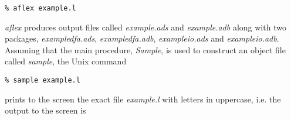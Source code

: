 \small
\begin{verbatim}
% aflex example.l
\end{verbatim}
\normalsize
   
{\sl aflex} produces output files called {\it example.ads} and {\it example.adb}
along with two packages, {\it example\-dfa.ads}, {\it example\-dfa.adb}, 
{\it example\-io.ads} and {\it example\-io.adb}.
Assuming that the main procedure, {\sl Sample}, is used to construct
an object file called {\it sample}, the Unix command

\small
\begin{verbatim}
% sample example.l
\end{verbatim}
\normalsize

prints to the screen the exact file {\it example.l} with letters in 
uppercase, i.e. the output to the screen is

